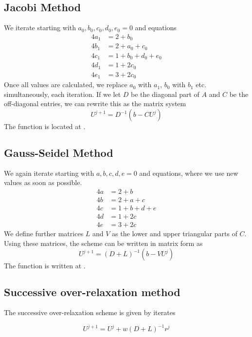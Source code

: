 \documentclass{article}
\numberwithin{equation}{section}
\theoremstyle{definition}
\begin{document}
\subsection{Jacobi Method}
We iterate starting with $a_0,b_0,c_0,d_0,e_0 = 0$ and equations
\begin{align}
    4a_1 &= 2 + b_0\\
    4b_1 &= 2 +a_0+c_0\\
    4c_1 &= 1 +b_0+d_0+e_0\\
    4d_1 &= 1+ 2c_0 \\
    4e_1 &= 3+2c_0
\end{align}
Once all values are calculated, we replace $a_0$ with $a_1$, $b_0$ with $b_1$ etc. simultaneously, each iteration.
If we let $D$ be the diagonal part of $A$ and $C$ be the off-diagonal entries, we can rewrite this as the matrix system
\begin{equation}
    U^{j+1} = D^{-1}(b - CU^j)
\end{equation}
The function is located at .


\subsection{Gauss-Seidel Method}
We again iterate starting with $a,b,c,d,e = 0$ and equations, where we use new values as soon as possible.
\begin{align}
    4a &= 2 + b\\
    4b &= 2 +a+c\\
    4c &= 1 +b+d+e\\
    4d &= 1+ 2c \\
    4e &= 3+2c
\end{align}
We define further matrices $L$ and $V$ as the lower and upper triangular parts of $C$. Using these matrices, the scheme can be written in matrix form as
\begin{equation}
    U^{j+1} = (D+L)^{-1}(b - VU^j)
\end{equation}
The function is written at .

\subsection{Successive over-relaxation method}
The successive over-relaxation scheme is given by iterates

\begin{equation}
    U^{j+1} = U^{j} + w (D + L)^{-1} r^j
\end{equation}
\end{document}
